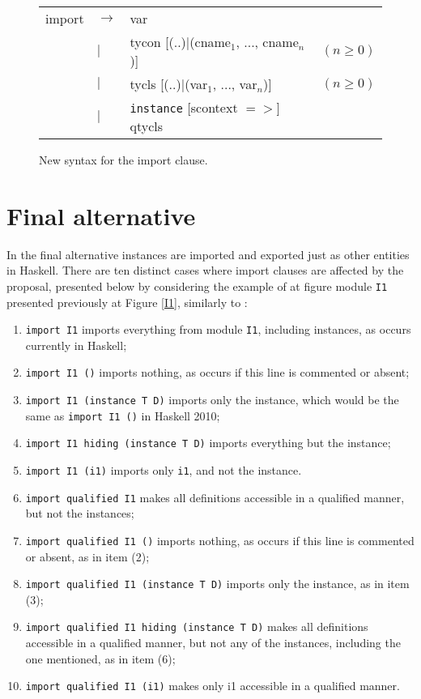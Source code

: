 \documentclass[msc]{ppgccufmg}
\begin{document}
\begin{figure}
\caption{New syntax for the import clause.\label{import}}
\begin{tabular}{|l l l l|}
\hline
import & $\to$ & var &\\
& $|$ & tycon [(..)$|$(cname$_1$, ..., cname$_n$)] & $(n \geq 0)$\\
& $|$ & tycls [(..)$|$(var$_1$, ..., var$_n$)] & $(n \geq 0)$\\
& $|$ & \texttt{instance} [scontext $=>$] qtycls &\\
\hline
\end{tabular}
\end{figure}

\section{Final alternative}

In the final alternative instances are imported and exported just as other entities in Haskell.  There are ten distinct
cases where import clauses are affected by the proposal, presented below by
considering the example of at figure  module
\texttt{I1} presented previously at Figure \ref{I1}, similarly to
\cite[section~5.3.4]{report}:
\begin{enumerate}
\item \texttt{import I1} imports everything from module \texttt{I1},
  including instances, as occurs currently in Haskell;
\item \texttt{import I1 ()} imports nothing, as occurs if this line
  is commented or absent;
\item \texttt{import I1 (instance T D)} imports only the instance, which
  would be the same as \texttt{import I1 ()} in Haskell 2010;
\item \texttt{import I1 hiding (instance T D)} imports everything but
  the instance;
\item \texttt{import I1 (i1)} imports only \texttt{i1}, and not the
  instance.
\item \texttt{import qualified I1} makes all definitions accessible in a
  qualified manner, but not the instances;
\item \texttt{import qualified I1 ()} imports nothing, as occurs if this line is
  commented or absent, as in item (2);
\item \texttt{import qualified I1 (instance T D)} imports only the instance,
  as in item (3);
\item \texttt{import qualified I1 hiding (instance T D)} makes all definitions
  accessible in a qualified manner, but not any of the instances, including the
  one mentioned, as in item (6);
\item \texttt{import qualified I1 (i1)} makes only i1 accessible in a qualified
  manner.
\end{enumerate}
\end{document}
